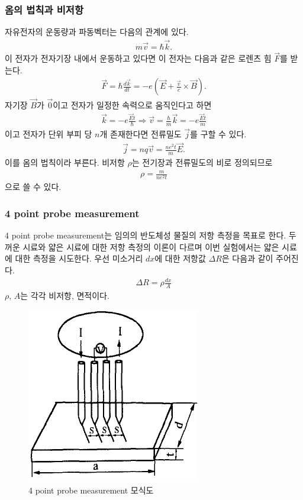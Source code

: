 \documentclass[aps,reprint,superscriptaddress,10pt]{revtex4-2}
\begin{document}
\subsubsection{옴의 법칙과 비저항}
자유전자의 운동량과 파동벡터는 다음의 관계에 있다.
\begin{align}
    m\vec{v} = \hbar \vec{k}.
\end{align}
이 전자가 전자기장 내에서 운동하고 있다면 이 전자는 다음과 같은 로렌츠 힘 $\vec{F}$를
받는다.
\begin{align}
    \vec{F} = \hbar\frac{d\vec{k}}{dt} 
    =-e\left(\vec{E}+\frac{\vec{v}}{c}\times \vec{B}\right).
\end{align}
자기장 $\vec{B}$가 $\vec{0}$이고 전자가 일정한 속력으로 움직인다고 하면
\begin{align}
    \vec{k} = -e\frac{\vec{E}t}{\hbar} \Longrightarrow
    \vec{v} = \frac{\hbar}{m}\vec{k}
    =-e\frac{\vec{E}t}{m}
\end{align}
이고 전자가 단위 부피 당 $n$개 존재한다면 전류밀도 $\vec{j}$를 구할 수 있다.
\begin{align}
    \vec{j} = nq\vec{v} = \frac{ne^2t}{m}\vec{E}.
\end{align}
이를 옴의 법칙이라 부른다. 비저항 $\rho$는 전기장과 전류밀도의 비로 정의되므로
\begin{align}
    \rho = \frac{m}{ne^2t}
\end{align}
으로 쓸 수 있다.
\subsubsection{4 point probe measurement}
4 point probe measurement는 임의의 반도체성 물질의 저항 측정을 목표로 한다.
두꺼운 시료와 얇은 시료에 대한 저항 측정의 이론이 다르며 이번 실험에서는 얇은 
시료에 대한 측정을 시도한다. 
우선 미소거리 $dx$에 대한 저항값 $\Delta R$은 다음과 같이 주어진다.
\begin{align}
    \Delta R = \rho\frac{dx}{A}
\end{align}
$\rho,\, A$는 각각 비저항, 면적이다.

\begin{figure}[htbp]
    \centering
    \includegraphics[scale = 0.5]{4probe.png}
    \caption{4 point probe measurement 모식도}
    \label{4probe}
  \end{figure}
\end{document}
